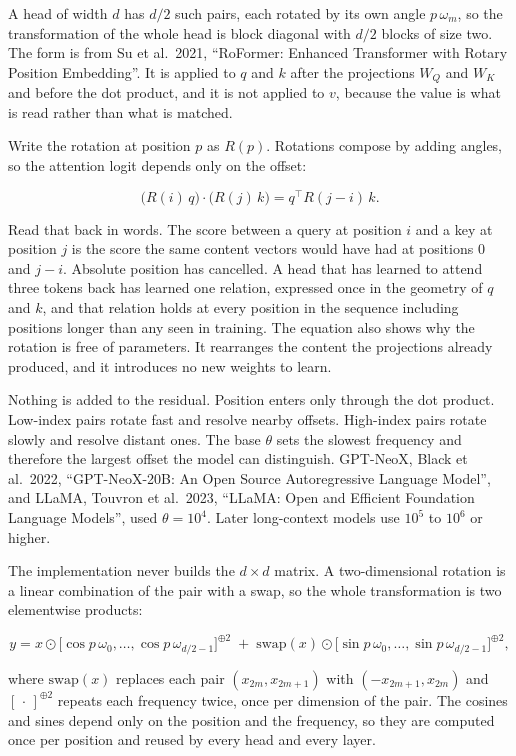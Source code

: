 A head of width \(d\) has \(d/2\) such pairs, each rotated by its own
angle \(p\,\omega_m\), so the transformation of the whole head is block
diagonal with \(d/2\) blocks of size two. The form is from Su et
al.~2021, ``RoFormer: Enhanced Transformer with Rotary Position
Embedding''. It is applied to \(q\) and \(k\) after the projections
\(W_Q\) and \(W_K\) and before the dot product, and it is not applied to
\(v\), because the value is what is read rather than what is matched.

Write the rotation at position \(p\) as \(R(p)\). Rotations compose by
adding angles, so the attention logit depends only on the offset:

\[
\big(R(i)\, q\big) \cdot \big(R(j)\, k\big) = q^{\top} R(j - i)\, k .
\]

Read that back in words. The score between a query at position \(i\) and
a key at position \(j\) is the score the same content vectors would have
had at positions \(0\) and \(j - i\). Absolute position has cancelled. A
head that has learned to attend three tokens back has learned one
relation, expressed once in the geometry of \(q\) and \(k\), and that
relation holds at every position in the sequence including positions
longer than any seen in training. The equation also shows why the
rotation is free of parameters. It rearranges the content the
projections already produced, and it introduces no new weights to learn.

Nothing is added to the residual. Position enters only through the dot
product. Low-index pairs rotate fast and resolve nearby offsets.
High-index pairs rotate slowly and resolve distant ones. The base
\(\theta\) sets the slowest frequency and therefore the largest offset
the model can distinguish. GPT-NeoX, Black et al.~2022, ``GPT-NeoX-20B:
An Open Source Autoregressive Language Model'', and LLaMA, Touvron et
al.~2023, ``LLaMA: Open and Efficient Foundation Language Models'', used
\(\theta = 10^4\). Later long-context models use \(10^5\) to \(10^6\) or
higher.

The implementation never builds the \(d \times d\) matrix. A
two-dimensional rotation is a linear combination of the pair with a
swap, so the whole transformation is two elementwise products:

\[
y = x \odot \big[\cos p\,\omega_0, \dots, \cos p\,\omega_{d/2-1}\big]^{\oplus 2}
\;+\; \text{swap}(x) \odot \big[\sin p\,\omega_0, \dots, \sin p\,\omega_{d/2-1}\big]^{\oplus 2},
\]

where \(\text{swap}(x)\) replaces each pair \((x_{2m}, x_{2m+1})\) with
\((-x_{2m+1}, x_{2m})\) and \([\,\cdot\,]^{\oplus 2}\) repeats each
frequency twice, once per dimension of the pair. The cosines and sines
depend only on the position and the frequency, so they are computed once
per position and reused by every head and every layer.

